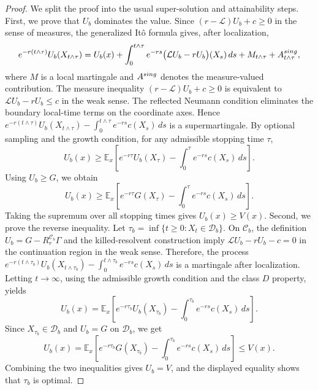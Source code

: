 \documentclass[10pt,a4paper]{amsart}
\begin{document}
\begin{proof} 
We split the proof into the usual super-solution and attainability steps. First, we prove that \(U_b\) dominates the value. Since 
$(r-\mathcal L)U_b+c\ge0$ in the sense of measures, the generalized It\^{o} formula gives, after localization, 
\[
e^{-r(t\wedge\tau)}U_b(X_{t\wedge\tau}) = U_b(x) + \int_0^{t\wedge\tau} e^{-rs} \big(\mathcal L U_b-rU_b\big)(X_s)\,ds + M_{t\wedge\tau} + A_{t\wedge\tau}^{\rm sing},
\]
where \(M\) is a local martingale and \(A^{\rm sing}\) denotes the measure-valued contribution. The measure inequality 
$\displaystyle (r-\mathcal L)U_b+c\ge0$ 
is equivalent to  
$\displaystyle \mathcal L U_b-rU_b\le c $
in the weak sense. The reflected Neumann condition eliminates the boundary local-time terms on the coordinate axes. Hence 
$\displaystyle e^{-r(t\wedge\tau)}U_b(X_{t\wedge\tau}) - \int_0^{t\wedge\tau}e^{-rs}c(X_s)\,ds $
is a supermartingale. By optional sampling and the growth condition, for any admissible stopping time \(\tau\), 
\[ 
U_b(x) \ge \mathbb E_x \left[ e^{-r\tau}U_b(X_\tau) - \int_0^\tau e^{-rs}c(X_s)\,ds \right]. 
\] 
Using \(U_b\ge G\), we obtain 
\[ 
U_b(x) \ge \mathbb E_x \left[ e^{-r\tau}G(X_\tau) - \int_0^\tau e^{-rs}c(X_s)\,ds \right]. 
\] 
Taking the supremum over all stopping times gives 
$U_b(x)\ge V(x)$. 
Second, we prove the reverse inequality. Let 
$\tau_b=\inf\{t\ge0:X_t\in\mathcal D_b\}$. 
On \(\mathcal C_b\), the definition 
$U_b=G-R_r^{\mathcal C_b}\Gamma$ 
and the killed-resolvent construction imply 
$\mathcal L U_b-rU_b-c=0 $
in the continuation region in the weak sense. Therefore, the process 
$\displaystyle e^{-r(t\wedge\tau_b)}U_b(X_{t\wedge\tau_b}) - \int_0^{t\wedge\tau_b}e^{-rs}c(X_s)\,ds$ 
is a martingale after localization. Letting \(t\to\infty\), using the admissible growth condition and the class \(D\) property, yields 
\[ 
U_b(x) = \mathbb E_x \left[ e^{-r\tau_b}U_b(X_{\tau_b}) - \int_0^{\tau_b}e^{-rs}c(X_s)\,ds \right]. 
\] 
Since \(X_{\tau_b}\in\mathcal D_b\) and \(U_b=G\) on \(\mathcal D_b\), we get 
\[ 
U_b(x) = \mathbb E_x \left[ e^{-r\tau_b}G(X_{\tau_b}) - \int_0^{\tau_b}e^{-rs}c(X_s)\,ds \right] \le V(x). 
\] 
Combining the two inequalities gives \(U_b=V\), and the displayed equality shows that \(\tau_b\) is optimal. 
\end{proof} 
\end{document}
